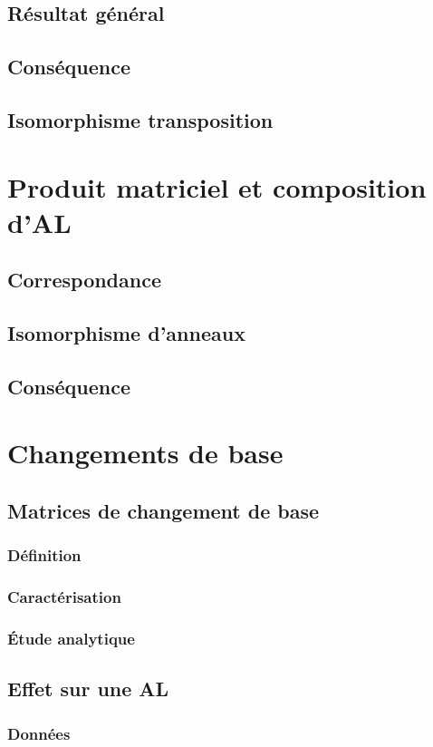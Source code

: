 \documentclass[12pt,a4paper,french]{book}
\begin{document}
		\subsection{Résultat général}
		\subsection{Conséquence}
		\subsection{Isomorphisme transposition}
	\section{Produit matriciel et composition d'AL}
		\subsection{Correspondance}
		\subsection{Isomorphisme d'anneaux}
		\subsection{Conséquence}
	\section{Changements de base}
		\subsection{Matrices de changement de base}
			\subsubsection{Définition}
			\subsubsection{Caractérisation}
			\subsubsection{Étude analytique}
		\subsection{Effet sur une AL}
			\subsubsection{Données}
\end{document}
